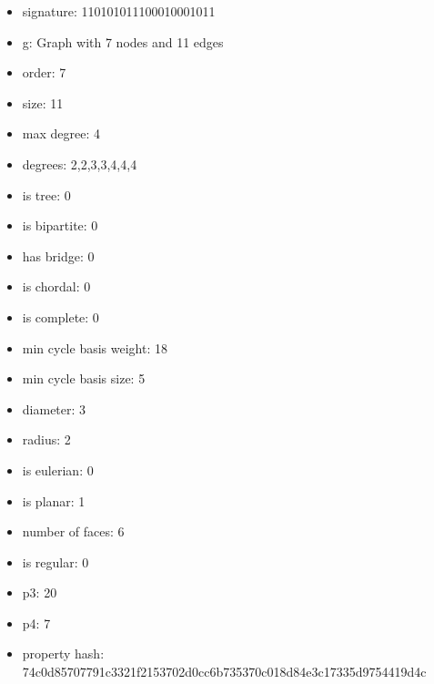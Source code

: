 \begin{itemize}
\item signature: 110101011100010001011
\item g: Graph with 7 nodes and 11 edges
\item order: 7
\item size: 11
\item max degree: 4
\item degrees: 2,2,3,3,4,4,4
\item is tree: 0
\item is bipartite: 0
\item has bridge: 0
\item is chordal: 0
\item is complete: 0
\item min cycle basis weight: 18
\item min cycle basis size: 5
\item diameter: 3
\item radius: 2
\item is eulerian: 0
\item is planar: 1
\item number of faces: 6
\item is regular: 0
\item p3: 20
\item p4: 7
\item property hash: 74c0d85707791c3321f2153702d0cc6b735370c018d84e3c17335d9754419d4c
\end{itemize}
\newpage
\begin{figure}
\end{figure}
